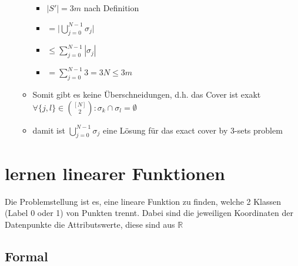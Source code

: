 \documentclass[12pt,a4paper]{article}
\begin{document}
\begin{itemize}
\begin{itemize}
\begin{itemize}
\item $|S'| = 3m$ nach Definition
\item $\displaystyle = \big\vert \bigcup_{j=0}^{N-1} \sigma_j \big\vert$
\item $\displaystyle \leq \sum_{j=0}^{N-1} |\sigma_j |$
\item $\displaystyle = \sum_{j=0}^{N-1} 3 = 3N \leq 3m$
\end{itemize}
\item Somit gibt es keine Überschneidungen, d.h. das Cover ist exakt\\
$\forall\{j,l\}\in\binom{[N]}{2}: \sigma_k\cap\sigma_l = \emptyset$
\item damit ist $\displaystyle \bigcup_{j=0}^{N-1} \sigma_j$ eine Lösung für das exact cover by 3-sets problem
\end{itemize}
\end{itemize}
\section{lernen linearer Funktionen}
Die Problemstellung ist es, eine lineare Funktion zu finden, welche 2 Klassen (Label 0 oder 1) von Punkten trennt. Dabei sind die jeweiligen Koordinaten der Datenpunkte die Attributswerte, diese sind aus $\mathbb{R}$
\subsection{Formal}
\end{document}
